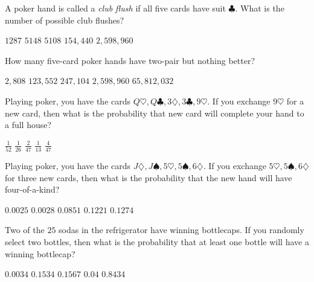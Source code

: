 \documentclass[answers,12pt]{exam}
\begin{document}
\begin{questions}
\question A poker hand is called a {\em club flush}
if all five cards have suit $\clubsuit$. What is
the number of possible club flushes?\\
\begin{oneparchoices}
\correctchoice $1287$
\choice $5148$ %
\choice $5108$ %
\choice $154,440$ %
\choice $2,598,960$ %
\end{oneparchoices}

\question 
How many five-card poker hands have two-pair but nothing better?\\
\begin{oneparchoices}
\choice $2,808$ %
\correctchoice $123,552$
\choice $247,104$ %
\choice $2,598,960$ %
\choice $65,812,032$ %
\end{oneparchoices}

\question Playing poker, you have the cards
$Q\heartsuit,Q\clubsuit,3\diamondsuit,3\clubsuit,9\heartsuit$.
If you exchange $9\heartsuit$ for a new card,
then what is the probability that new card
will complete your hand to a full house?\\
\begin{oneparchoices}
\choice $\frac{1}{52}$
\choice $\frac{1}{26}$ %
\choice $\frac{2}{47}$ %
\choice $\frac{1}{13}$ %
\correctchoice $\frac{4}{47}$
\end{oneparchoices}

\question Playing poker, you have the cards
$J\diamondsuit,J\spadesuit,5\heartsuit,5\spadesuit,6\diamondsuit$.
If you exchange $5\heartsuit,5\spadesuit,6\diamondsuit$ for three
new cards, then what is the probability that the new hand
will have four-of-a-kind?\\
\begin{oneparchoices}
\choice $0.0025$ %
\correctchoice $0.0028$
\choice $0.0851$ %
\choice $0.1221$ %
\choice $0.1274$ %
\end{oneparchoices}

\question Two of the $25$ sodas in the refrigerator
have winning bottlecaps. If you randomly select two
bottles, then what is the probability that at least one bottle
will have a winning bottlecap?\\
\begin{oneparchoices}
\choice $0.0034$ %
\choice $0.1534$ %
\correctchoice $0.1567$
\choice $0.04$ %
\choice $0.8434$ %
\end{oneparchoices}

\end{questions}
\end{document}
